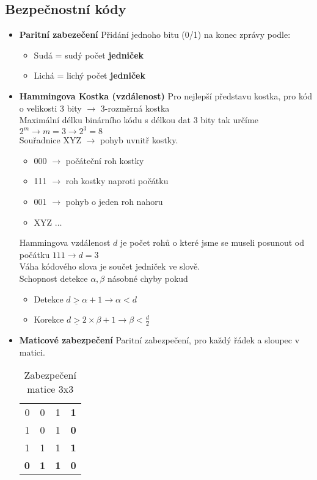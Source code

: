 \documentclass{article}
\begin{document}
\subsection{Bezpečnostní kódy}
\begin{itemize}
    \item \textbf{Paritní zabezečení}
        Přidání jednoho bitu (0/1) na konec zprávy podle:
        \begin{itemize}
            \item Sudá = sudý počet \textbf{jedniček}
            \item Lichá = lichý počet \textbf{jedniček}
        \end{itemize}
    \item \textbf{Hammingova Kostka (vzdálenost)}
        Pro nejlepší představu kostka, pro kód o velikosti 3 bity $\rightarrow$ 3-rozměrná kostka \\
        Maximální délku binárního kódu s délkou dat 3 bity tak určíme $2^m \rightarrow m=3 \rightarrow 2^3=8$ \\
        Souřadnice XYZ $\rightarrow$ pohyb uvnitř kostky.
        \begin{itemize}
            \item 000 $\rightarrow$ počáteční roh kostky
            \item 111 $\rightarrow$ roh kostky naproti počátku
            \item 001 $\rightarrow$ pohyb o jeden roh nahoru
            \item XYZ $\dots$
        \end{itemize}
        Hammingova vzdálenost $d$ je počet rohů o které jsme se museli posunout od počátku
        $111 \rightarrow d=3$ \\
        Váha kódového slova je součet jedniček ve slově.\\
        Schopnost detekce $\alpha, \beta$ násobné chyby pokud
        \begin{itemize}
            \item Detekce $d\underline{>}\alpha+1 \rightarrow \alpha<d$
            \item Korekce $d\underline{>}2\times\beta+1 \rightarrow \beta<\frac{d}{2}$
        \end{itemize}
    \item \textbf{Maticové zabezpečení}
    Paritní zabezpečení, pro každý řádek a sloupec v matici.
    \begin{table}[h]
    \centering
        \begin{tabular}{c c c c}
            0 & 0 & 1 & \textbf{1} \\
            1 & 0 & 1 & \textbf{0} \\
            1 & 1 & 1 & \textbf{1} \\
            \textbf{0} & \textbf{1} & \textbf{1} & \textbf{0} \\
        \end{tabular}
        \caption{Zabezpečení matice 3x3}
        \label{tab:matr}
    \end{table}
\end{itemize}
\end{document}
